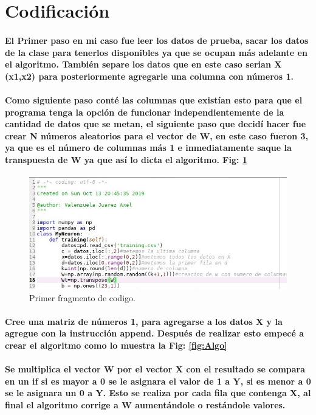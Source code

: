 \documentclass[10pt,a4paper]{article}
\begin{document}
\section{
Codificaci\'on
}

\paragraph{El Primer paso en mi caso fue leer los datos de prueba, sacar los datos de la clase para tenerlos disponibles ya que se ocupan m\'as adelante en el algoritmo. Tambi\'en separe los datos que en este caso serian X (x1,x2) para posteriormente agregarle una columna con n\'umeros 1. }

\paragraph{Como siguiente paso cont\'e las columnas que exist\'ian esto para que el programa tenga la opci\'on de funcionar independientemente de la cantidad de datos que se metan, el siguiente paso que decid\'i hacer fue crear N n\'umeros aleatorios para el vector de W, en este caso fueron 3, ya que es el n\'umero de columnas m\'as 1 e inmediatamente saque la transpuesta de W ya que as\'i lo dicta el algoritmo. Fig: \ref{fig:CreacionW} }
\begin{figure}[h]
\includegraphics[scale=0.5] {cod1.jpg}
\caption{Primer fragmento de codigo.}
\label{fig:CreacionW}
\end{figure}

\paragraph{Cree una matriz de n\'umeros 1, para agregarse a los datos X y la agregue con la instrucci\'on append. Despu\'es de realizar esto empec\'e a crear el algoritmo como lo muestra la Fig: \ref{fig:Algo} }

\paragraph{Se multiplica el vector W por el vector X con el resultado se compara en un if si es mayor a 0 se le asignara el valor de 1 a Y, si es menor a 0 se le asignara un 0 a Y. Esto se realiza por cada fila que contenga X, al final el algoritmo corrige a W aument\'andole o rest\'andole valores.}
\end{document}
